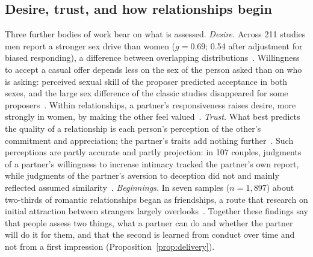\subsection{Desire, trust, and how relationships begin}\label{sec:desire}

Three further bodies of work bear on what is assessed. \emph{Desire.} Across 211 studies men report a stronger sex drive
than women ($g=0.69$; 0.54 after adjustment for biased responding), a difference between overlapping
distributions~\cite{frankenbach2022}. Willingness to accept a casual offer depends less on the sex of the person asked than on
who is asking: perceived sexual skill of the proposer predicted acceptance in both sexes, and the large sex difference of the
classic studies disappeared for some proposers~\cite{conley2011}. Within relationships, a partner's responsiveness raises
desire, more strongly in women, by making the other feel valued~\cite{birnbaum2016}. \emph{Trust.} What best predicts the
quality of a relationship is each person's perception of the other's commitment and appreciation; the partner's traits add
nothing further~\cite{joel2020}. Such perceptions are partly accurate and partly projection: in 107 couples, judgments of a
partner's willingness to increase intimacy tracked the partner's own report, while judgments of the partner's aversion to
deception did not and mainly reflected assumed similarity~\cite{wickham2020}. \emph{Beginnings.} In seven samples
($n=1{,}897$) about two-thirds of romantic relationships began as friendships, a route that research on initial attraction
between strangers largely overlooks~\cite{stinson2022}. Together these findings say that people assess two things, what a
partner can do and whether the partner will do it for them, and that the second is learned from conduct over time and not
from a first impression (Proposition~\ref{prop:delivery}).

